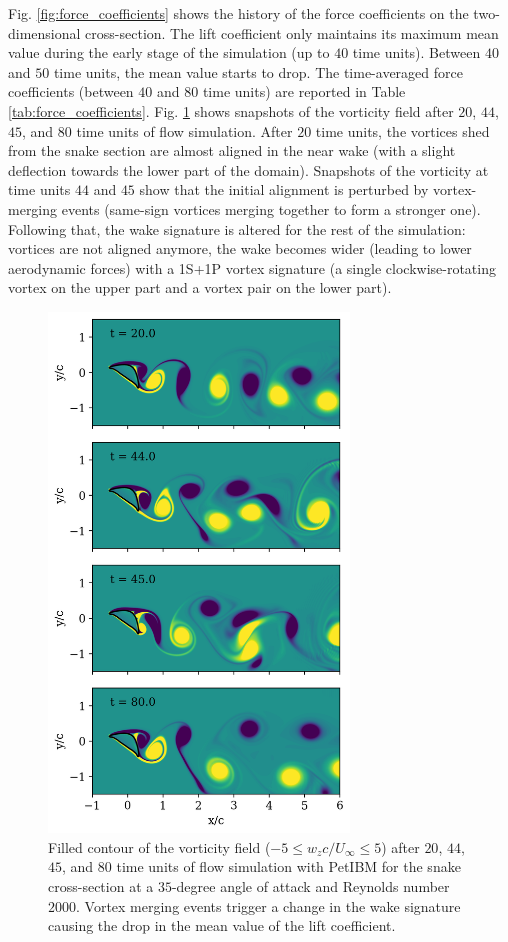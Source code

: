 \documentclass[10pt,journal,compsoc]{IEEEtran}
\begin{document}
Fig. \ref{fig:force_coefficients} shows the history of the force coefficients on the two-dimensional cross-section.
The lift coefficient only maintains its maximum mean value during the early stage of the simulation (up to $40$ time units).
Between $40$ and $50$ time units, the mean value starts to drop.
The time-averaged force coefficients (between $40$ and $80$ time units) are reported in Table \ref{tab:force_coefficients}.
Fig. \ref{fig:wz_2d} shows snapshots of the vorticity field after $20$, $44$, $45$, and $80$ time units of flow simulation.
After $20$ time units, the vortices shed from the snake section are almost aligned in the near wake (with a slight deflection towards the lower part of the domain).
Snapshots of the vorticity at time units $44$ and $45$ show that the initial alignment is perturbed by vortex-merging events (same-sign vortices merging together to form a stronger one).
Following that, the wake signature is altered for the rest of the simulation: vortices are not aligned anymore, the wake becomes wider (leading to lower aerodynamic forces) with a 1S+1P vortex signature (a single clockwise-rotating vortex on the upper part and a vortex pair on the lower part).

\begin{figure}[!h]
    \centering
    \includegraphics[width=8cm]{figures/wz_multi_contourf.png}
    \caption{Filled contour of the vorticity field ($-5 \leq w_z c / U_\infty \leq 5$) after $20$, $44$, $45$, and $80$ time units of flow simulation with PetIBM for the snake cross-section at a $35$-degree angle of attack and Reynolds number $2000$. Vortex merging events trigger a change in the wake signature causing the drop in the mean value of the lift coefficient.}
    \label{fig:wz_2d}
\end{figure}
\end{document}
